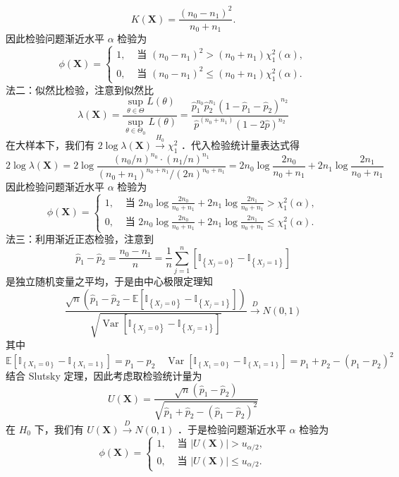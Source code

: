 \documentclass[UTF8,openany]{book}
\begin{document}
	$$
	K(\boldsymbol{X})=\frac{\left(n_0-n_1\right)^2}{n_0+n_1} .
	$$
	因此检验问题渐近水平 $\alpha$ 检验为
	$$
	\phi(\boldsymbol{X})= \begin{cases}1, & \text { 当 }\left(n_0-n_1\right)^2>\left(n_0+n_1\right) \chi_1^2(\alpha), \\ 0, & \text { 当 }\left(n_0-n_1\right)^2 \leq\left(n_0+n_1\right) \chi_1^2(\alpha) .\end{cases}
	$$
	法二：似然比检验，注意到似然比
	$$
	\lambda(\boldsymbol{X})=\frac{\sup _{\theta \in \Theta} L(\theta)}{\sup _{\theta \in \Theta_0} L(\theta)}=\frac{\hat{p}_1^{n_0} \hat{p}_2^{n_1}\left(1-\hat{p}_1-\hat{p}_2\right)^{n_2}}{\hat{p}^{\left(n_0+n_1\right)}(1-2 \hat{p})^{n_2}}
	$$
	在大样本下，我们有 $2 \log \lambda(\boldsymbol{X}) \xrightarrow{H_0} \chi_1^2$ ．代入检验统计量表达式得
	$$
	2 \log \lambda(\boldsymbol{X})=2 \log \frac{\left(n_0 / n\right)^{n_0} \cdot\left(n_1 / n\right)^{n_1}}{\left(n_0+n_1\right)^{n_0+n_1} /(2 n)^{n_0+n_1}}=2 n_0 \log \frac{2 n_0}{n_0+n_1}+2 n_1 \log \frac{2 n_1}{n_0+n_1}
	$$
	因此检验问题渐近水平 $\alpha$ 检验为
	$$
	\phi(\boldsymbol{X})= \begin{cases}1, & \text { 当 } 2 n_0 \log \frac{2 n_0}{n_0+n_1}+2 n_1 \log \frac{2 n_1}{n_0+n_1}>\chi_1^2(\alpha), \\ 0, & \text { 当 } 2 n_0 \log \frac{2 n_0}{n_0+n_1}+2 n_1 \log \frac{2 n_1}{n_0+n_1} \leq \chi_1^2(\alpha) .\end{cases}
	$$
	法三：利用渐近正态检验，注意到
	$$
	\hat{p}_1-\hat{p}_2=\frac{n_0-n_1}{n}=\frac{1}{n} \sum_{j=1}^n\left[\mathbb{I}_{\left\{X_j=0\right\}}-\mathbb{I}_{\left\{X_j=1\right\}}\right]
	$$
	是独立随机变量之平均，于是由中心极限定理知
	$$
	\frac{\sqrt{n}\left(\hat{p}_1-\hat{p}_2-\mathbb{E}\left[\mathbb{I}_{\left\{X_j=0\right\}}-\mathbb{I}_{\left\{X_j=1\right\}}\right]\right)}{\sqrt{\operatorname{Var}\left[\mathbb{I}_{\left\{X_j=0\right\}}-\mathbb{I}_{\left\{X_j=1\right\}}\right]}} \xrightarrow{D} N(0,1)
	$$
	其中 $$\mathbb{E}\left[\mathbb{I}_{\left\{X_1=0\right\}}-\mathbb{I}_{\left\{X_1=1\right\}}\right]=p_1-p_2\quad \operatorname{Var}\left[\mathbb{I}_{\left\{X_1=0\right\}}-\mathbb{I}_{\left\{X_1=1\right\}}\right]=p_1+p_2-\left(p_1-p_2\right)^2$$
	结合 Slutsky 定理，因此考虑取检验统计量为
	$$
	U(\boldsymbol{X})=\frac{\sqrt{n}\left(\hat{p}_1-\hat{p}_2\right)}{\sqrt{\hat{p}_1+\hat{p}_2-\left(\hat{p}_1-\hat{p}_2\right)^2}}
	$$
	在 $H_0$ 下，我们有 $U(\boldsymbol{X}) \xrightarrow{D} N(0,1)$ ．于是检验问题渐近水平 $\alpha$ 检验为
	$$
	\phi(\boldsymbol{X})= \begin{cases}1, & \text { 当 }|U(\boldsymbol{X})|>u_{\alpha / 2}, \\ 0, & \text { 当 }|U(\boldsymbol{X})| \leq u_{\alpha / 2} .\end{cases}
	$$
\end{document}
